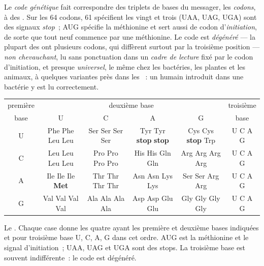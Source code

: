 \begin{definition}\label{def:b1:gene-expression:code}
Le \emph{code génétique} fait correspondre des triplets de bases du
messager, les \emph{codons}, à des . Sur les 64 codons, 61
spécifient les vingt  et trois (UAA, UAG, UGA) sont des
signaux \emph{stop}~; AUG spécifie la méthionine et sert aussi de codon
d'\emph{initiation}, de sorte que tout  neuf commence par une
méthionine. Le code est \emph{dégénéré} --- la plupart des 
ont plusieurs codons, qui diffèrent surtout par la troisième position
--- \emph{non chevauchant}, lu sans ponctuation dans un \emph{cadre de
lecture} fixé par le codon d'initiation, et presque \emph{universel}, le
même chez les bactéries, les plantes et les animaux, à quelques
variantes près dans les ~: un  humain introduit dans
une bactérie y est lu correctement.
\end{definition}

\begin{omfigure}
\begin{center}
\footnotesize
\begin{tabular}{c|cccc|c}
\hline
première & \multicolumn{4}{c|}{deuxième base} & troisième \\
base & U & C & A & G & base \\
\hline
U & Phe Phe Leu Leu & Ser Ser Ser Ser & Tyr Tyr \textbf{stop} \textbf{stop} & Cys Cys \textbf{stop} Trp & U C A G \\
C & Leu Leu Leu Leu & Pro Pro Pro Pro & His His Gln Gln & Arg Arg Arg Arg & U C A G \\
A & Ile Ile Ile \textbf{Met} & Thr Thr Thr Thr & Asn Asn Lys Lys & Ser Ser Arg Arg & U C A G \\
G & Val Val Val Val & Ala Ala Ala Ala & Asp Asp Glu Glu & Gly Gly Gly Gly & U C A G \\
\hline
\end{tabular}
\end{center}

{\small Le . Chaque case donne les quatre  ayant les
première et deuxième bases indiquées et pour troisième base U, C, A, G
dans cet ordre. AUG est la méthionine et le signal d'initiation~; UAA,
UAG et UGA sont des stops. La troisième base est souvent indifférente~:
le code est dégénéré.}
\end{omfigure}

